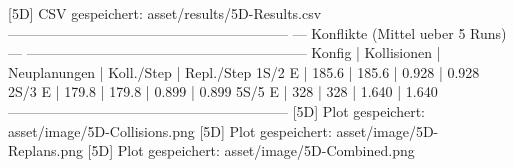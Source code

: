 [5D]      CSV gespeichert: asset/results/5D-Results.csv
------------------------------------------------------------
--- Konflikte (Mittel ueber 5 Runs) ---
------------------------------------------------------------
Konfig   | Kollisionen | Neuplanungen | Koll./Step | Repl./Step
   1S/2  E |       185.6 |        185.6 |      0.928 |      0.928
   2S/3  E |       179.8 |        179.8 |      0.899 |      0.899
   5S/5  E |         328 |          328 |      1.640 |      1.640
------------------------------------------------------------
[5D]      Plot gespeichert: asset/image/5D-Collisions.png
[5D]      Plot gespeichert: asset/image/5D-Replans.png
[5D]      Plot gespeichert: asset/image/5D-Combined.png